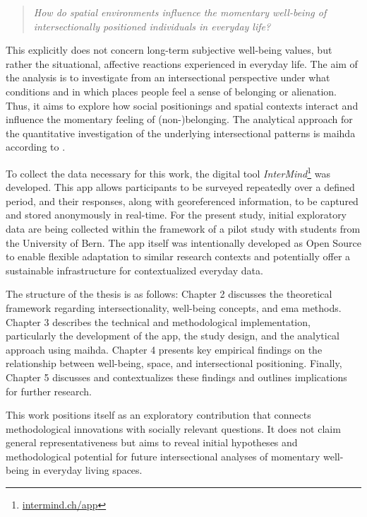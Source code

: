 \begin{quote}
\emph{How do spatial environments influence the momentary well-being of intersectionally positioned individuals in everyday life?}
\end{quote}

This explicitly does not concern long-term subjective well-being values, but rather the situational, affective reactions experienced in everyday life. The aim of the analysis is to investigate from an intersectional perspective under what conditions and in which places people feel a sense of belonging or alienation. Thus, it aims to explore how social positionings and spatial contexts interact and influence the momentary feeling of (non-)belonging. The analytical approach for the quantitative investigation of the underlying intersectional patterns is \gls{maihda} according to \textcite{grossModellingIntersectionalityQuantitative2023}.

To collect the data necessary for this work, the digital tool \emph{InterMind}\footnote{\href{[https://intermind.ch/app](https://intermind.ch/app)}{intermind.ch/app}} was developed. This app allows participants to be surveyed repeatedly over a defined period, and their responses, along with georeferenced information, to be captured and stored anonymously in real-time. For the present study, initial exploratory data are being collected within the framework of a pilot study with students from the University of Bern. The app itself was intentionally developed as Open Source to enable flexible adaptation to similar research contexts and potentially offer a sustainable infrastructure for contextualized everyday data.

The structure of the thesis is as follows: Chapter 2 discusses the theoretical framework regarding intersectionality, well-being concepts, and \gls{ema} methods. Chapter 3 describes the technical and methodological implementation, particularly the development of the app, the study design, and the analytical approach using \gls{maihda}. Chapter 4 presents key empirical findings on the relationship between well-being, space, and intersectional positioning. Finally, Chapter 5 discusses and contextualizes these findings and outlines implications for further research.

This work positions itself as an exploratory contribution that connects methodological innovations with socially relevant questions. It does not claim general representativeness but aims to reveal initial hypotheses and methodological potential for future intersectional analyses of momentary well-being in everyday living spaces.